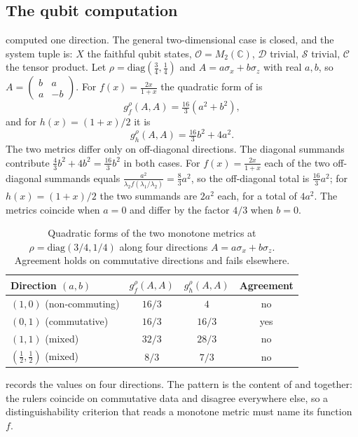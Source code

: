 \documentclass[11pt,letterpaper]{article}
\theoremstyle{definition}
\theoremstyle{remark}
\begin{document}
\subsection{The qubit computation}

 computed one direction. The general two-dimensional case is closed, and the system tuple is: $X$ the faithful qubit states, $\mathcal{O} = M_2(\mathbb{C})$, $\mathcal{D}$ trivial, $\mathcal{S}$ trivial, $\mathcal{C}$ the tensor product. Let $\rho = \mathrm{diag}(\tfrac{3}{4}, \tfrac{1}{4})$ and $A = a \sigma_x + b \sigma_z$ with real $a, b$, so $A = \left(\begin{smallmatrix} b & a \\ a & -b \end{smallmatrix}\right)$. For $f(x) = \tfrac{2x}{1+x}$ the quadratic form of  is
\[
g_f^{\rho}(A, A) = \tfrac{16}{3}(a^2 + b^2),
\]
and for $h(x) = (1+x)/2$ it is
\[
g_h^{\rho}(A, A) = \tfrac{16}{3} b^2 + 4 a^2.
\]
The two metrics differ only on off-diagonal directions. The diagonal summands contribute $\tfrac{4}{3}b^2 + 4b^2 = \tfrac{16}{3}b^2$ in both cases. For $f(x) = \tfrac{2x}{1+x}$ each of the two off-diagonal summands equals $\tfrac{a^2}{\lambda_2 f(\lambda_1/\lambda_2)} = \tfrac{8}{3}a^2$, so the off-diagonal total is $\tfrac{16}{3}a^2$; for $h(x) = (1+x)/2$ the two summands are $2a^2$ each, for a total of $4a^2$. The metrics coincide when $a = 0$ and differ by the factor $4/3$ when $b = 0$.

\begin{table}[t]
\centering
\small
\begin{tabular}{@{} lccc @{}}
\toprule
Direction $(a, b)$ & $g_f^{\rho}(A, A)$ & $g_h^{\rho}(A, A)$ & Agreement \\
\midrule
$(1, 0)$ (non-commuting) & $16/3$ & $4$ & no \\
$(0, 1)$ (commutative) & $16/3$ & $16/3$ & yes \\
$(1, 1)$ (mixed) & $32/3$ & $28/3$ & no \\
$(\tfrac{1}{2}, \tfrac{1}{2})$ (mixed) & $8/3$ & $7/3$ & no \\
\bottomrule
\end{tabular}
\caption{Quadratic forms of the two monotone metrics at $\rho = \mathrm{diag}(3/4, 1/4)$ along four directions $A = a\sigma_x + b\sigma_z$. Agreement holds on commutative directions and fails elsewhere.}
\label{tab:qubit}
\end{table}

 records the values on four directions. The pattern is the content of  and  together: the rulers coincide on commutative data and disagree everywhere else, so a distinguishability criterion that reads a monotone metric must name its function $f$.
\end{document}
